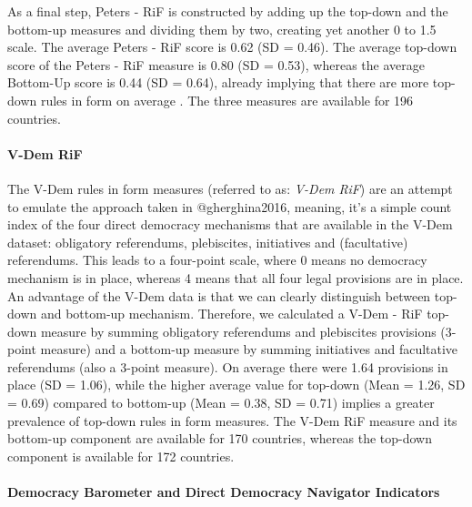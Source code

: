 \documentclass[]{article}
\let\oldparagraph\paragraph
\renewcommand{\paragraph}[1]{\oldparagraph{#1}\mbox{}}
\begin{document}
As a final step, Peters - RiF is constructed by adding up the top-down
and the bottom-up measures and dividing them by two, creating yet
another 0 to 1.5 scale. The average Peters - RiF score is 0.62 (SD =
0.46). The average top-down score of the Peters - RiF measure is 0.80
(SD = 0.53), whereas the average Bottom-Up score is 0.44 (SD = 0.64),
already implying that there are more top-down rules in form on average .
The three measures are available for 196 countries.

\paragraph{V-Dem RiF}\label{v-dem-rif}

The V-Dem rules in form measures (referred to as: \emph{V-Dem RiF}) are
an attempt to emulate the approach taken in @gherghina2016, meaning,
it's a simple count index of the four direct democracy mechanisms that
are available in the V-Dem dataset: obligatory referendums, plebiscites,
initiatives and (facultative) referendums. This leads to a four-point
scale, where 0 means no democracy mechanism is in place, whereas 4 means
that all four legal provisions are in place. An advantage of the V-Dem
data is that we can clearly distinguish between top-down and bottom-up
mechanism. Therefore, we calculated a V-Dem - RiF top-down measure by
summing obligatory referendums and plebiscites provisions (3-point
measure) and a bottom-up measure by summing initiatives and facultative
referendums (also a 3-point measure). On average there were 1.64
provisions in place (SD = 1.06), while the higher average value for
top-down (Mean = 1.26, SD = 0.69) compared to bottom-up (Mean = 0.38, SD
= 0.71) implies a greater prevalence of top-down rules in form measures.
The V-Dem RiF measure and its bottom-up component are available for 170
countries, whereas the top-down component is available for 172
countries.

\paragraph{Democracy Barometer and Direct Democracy Navigator
Indicators}\label{democracy-barometer-and-direct-democracy-navigator-indicators}
\end{document}

